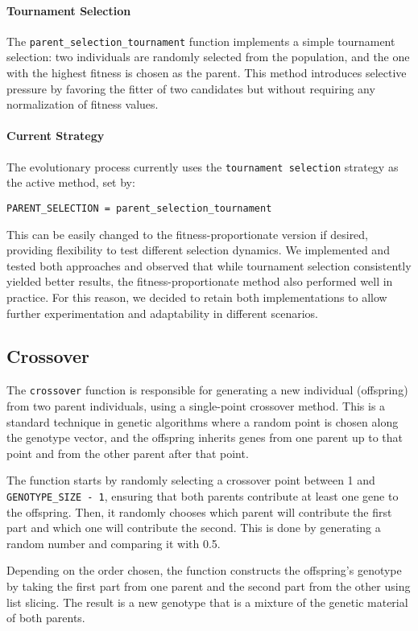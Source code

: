 \documentclass{article}
\begin{document}
\paragraph{Tournament Selection}
The \texttt{parent\_selection\_tournament} function implements a simple tournament selection: two individuals are randomly selected from the population, and the one with the highest fitness is chosen as the parent. This method introduces selective pressure by favoring the fitter of two candidates but without requiring any normalization of fitness values.

\paragraph{Current Strategy}
The evolutionary process currently uses the \texttt{tournament selection} strategy as the active method, set by:
\begin{verbatim}
PARENT_SELECTION = parent_selection_tournament
\end{verbatim}
This can be easily changed to the fitness-proportionate version if desired, providing flexibility to test different selection dynamics. We implemented and tested both approaches and observed that while tournament selection consistently yielded better results, the fitness-proportionate method also performed well in practice. For this reason, we decided to retain both implementations to allow further experimentation and adaptability in different scenarios.

\subsection{Crossover}
The \texttt{crossover} function is responsible for generating a new individual (offspring) from two parent individuals, using a single-point crossover method. This is a standard technique in genetic algorithms where a random point is chosen along the genotype vector, and the offspring inherits genes from one parent up to that point and from the other parent after that point.

The function starts by randomly selecting a crossover point between 1 and \texttt{GENOTYPE\_SIZE - 1}, ensuring that both parents contribute at least one gene to the offspring. Then, it randomly chooses which parent will contribute the first part and which one will contribute the second. This is done by generating a random number and comparing it with 0.5.

Depending on the order chosen, the function constructs the offspring's genotype by taking the first part from one parent and the second part from the other using list slicing. The result is a new genotype that is a mixture of the genetic material of both parents.
\end{document}
